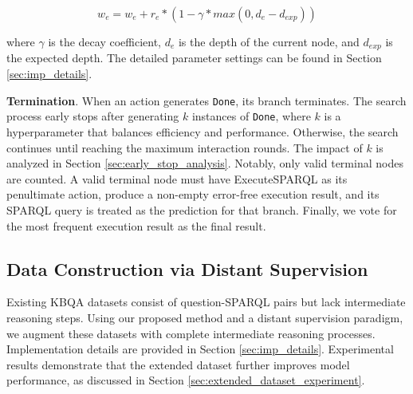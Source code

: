 \begin{equation}
    w_e = w_e + r_e * (1 - \gamma * max(0, d_e - d_{exp}))
\end{equation}

where $\gamma$ is the decay coefficient, $d_e$ is the depth of the current node, and $d_{exp}$ is the expected depth. The detailed parameter settings can be found in Section \ref{sec:imp_details}.


\textbf{Termination}.
When an action generates \texttt{Done}, its branch terminates. The search process early stops after generating $k$ instances of \texttt{Done}, where $k$ is a hyperparameter that balances efficiency and performance. 
Otherwise, the search continues until reaching the maximum interaction rounds.
The impact of $k$ is analyzed in Section \ref{sec:early_stop_analysis}.
Notably, only valid terminal nodes are counted. 
A valid terminal node must have ExecuteSPARQL as its penultimate action, produce a non-empty error-free execution result, and its SPARQL query is treated as the prediction for that branch.
Finally, we vote for the most frequent execution result as the final result.

\subsection{Data Construction via Distant Supervision}

Existing KBQA datasets consist of question-SPARQL pairs but lack intermediate reasoning steps. Using our proposed method and a distant supervision paradigm, we augment these datasets with complete intermediate reasoning processes.
Implementation details are provided in Section \ref{sec:imp_details}.
Experimental results demonstrate that the extended dataset further improves model performance, as discussed in Section \ref{sec:extended_dataset_experiment}.
